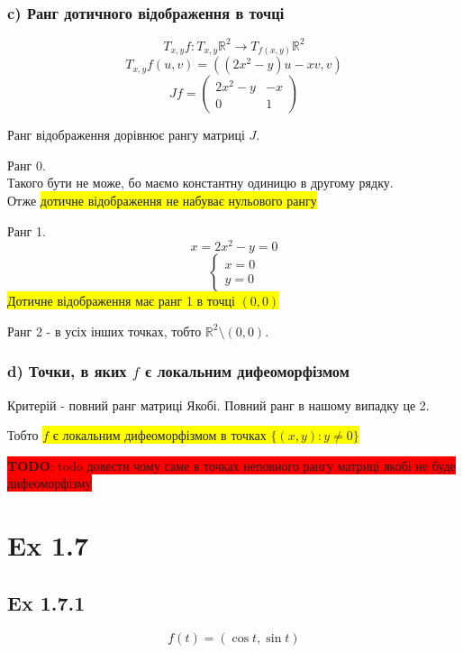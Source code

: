\documentclass[10pt, a4paper]{article} %
\newcommand{\R}{\mathbb{R}}
\newcommand{\todo}[1]{\colorbox{red}{\textbf{TODO}: #1}}
\begin{document}
\subsubsection*{c) Ранг дотичного відображення в точці}
\[T_{x,y}f : T_{x,y}\R^2 \to T_{f(x,y)}\R^2\]
\[T_{x,y}f(u,v) = ((2x^2-y)u-xv, v)\]
\[Jf = \begin{pmatrix}
    2x^2-y & -x\\
        0 & 1
\end{pmatrix}\]

Ранг відображення дорівнює рангу матриці $J$. 

Ранг 0.\\
Такого бути не може, бо маємо константну одиницю в другому рядку. \\
Отже \colorbox{yellow}{дотичне відображення не набуває нульового рангу}

Ранг 1.
\[x=2x^2-y=0\]
\[\begin{cases}
    x = 0\\
    y = 0
\end{cases}\]
\colorbox{yellow}{Дотичне відображення має ранг 1 в точці $(0,0)$}

Ранг 2 - в усіх інших точках, тобто $\R^2 \setminus (0,0)$.

\subsubsection*{d) Точки, в яких $f$ є локальним дифеоморфізмом}
Критерій - повний ранг матриці Якобі.
Повний ранг в нашому випадку це 2.

Тобто \colorbox{yellow}{$f$ є локальним дифеоморфізмом в точках $\{(x,y) : y\ne 0\}$}

\todo{todo довести чому саме в точках неповного рангу матриці якобі не буде дифеоморфізму}


\section*{Ex 1.7}

\subsection*{Ex 1.7.1}
\[f(t) = (\cos t, \sin t)\]
\end{document}
